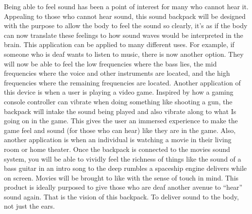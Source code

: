 Being able to feel sound has been a point of interest for many who cannot hear it. Appealing to those who cannot hear sound, this sound backpack will be designed with the purpose to allow the body to feel the sound so clearly, it’s as if the body can now translate these feelings to how sound waves would be interpreted in the brain. This application can be applied to many different uses. For example, if someone who is deaf wants to listen to music, there is now another option. They will now be able to feel the low frequencies where the bass lies, the mid frequencies where the voice and other instruments are located, and the high frequencies where the remaining frequencies are  located. Another application of this device is when a user is playing a video game. Inspired by how a gaming console controller can vibrate when doing something like shooting a gun, the backpack will intake the sound being played and also vibrate along to what Is going on in the game. This gives the user an immersed experience to make the game feel and sound (for those who can hear) like they are in the game. Also, another application is when an individual is watching a movie in their living room or home theater. Once the backpack is connected to the movies sound system, you will be able to vividly feel the richness of things like the sound of a bass guitar in an intro song to the deep rumbles a spaceship engine delivers while on screen. Movies will be brought to like with the sense of touch in mind. This product is ideally purposed to give those who are deaf another avenue to “hear” sound again. That is the vision of this backpack. To deliver sound to the body, not just the ears.  
